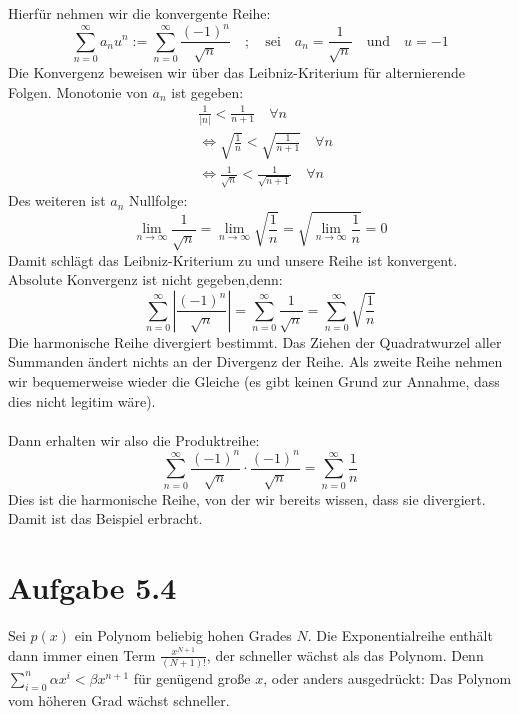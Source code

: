 \documentclass[a4paper,german,12pt,smallheadings]{scrartcl}
\begin{document}
Hierfür nehmen wir die konvergente Reihe:
\begin{equation*}
\sum\limits_{n=0}^{\infty} a_nu^n:=\sum\limits_{n=0}^{\infty} \frac{(-1)^n}{\sqrt{n}} \quad ; \quad \text{sei} \quad a_n=\frac{1}{\sqrt{n}} \quad \text{und} \quad u=-1
\end{equation*}
Die Konvergenz beweisen wir über das Leibniz-Kriterium für alternierende Folgen. Monotonie von $a_n$ ist gegeben:
\begin{align*}
  & \frac{1}{|n|}<\frac{1}{n+1} \quad \forall n\\
  & \Leftrightarrow \sqrt{\frac{1}{n}}<\sqrt{\frac{1}{n+1}} \quad \forall n\\
  & \Leftrightarrow \frac{1}{\sqrt{n}}< \frac{1}{\sqrt{n+1}} \quad \forall n
\end{align*}
Des weiteren ist $a_n$ Nullfolge:
\begin{equation}
\lim\limits_{n \to \infty} \frac{1}{\sqrt{n}}=\lim\limits_{n \to \infty} \sqrt{\frac{1}{n}}=\sqrt{\lim\limits_{n \to \infty} \frac{1}{n}}=0
\end{equation}
Damit schlägt das Leibniz-Kriterium zu und unsere Reihe ist konvergent.\\
Absolute Konvergenz ist nicht gegeben,denn:
\begin{equation*}
\sum\limits_{n=0}^{\infty} |\frac{(-1)^n}{\sqrt{n}}| = \sum\limits_{n=0}^{\infty} \frac{1}{\sqrt{n}}=\sum\limits_{n=0}^{\infty} \sqrt{\frac{1}{n}}
\end{equation*}
Die harmonische Reihe divergiert bestimmt. Das Ziehen der Quadratwurzel aller Summanden ändert nichts an der Divergenz der Reihe.
Als zweite Reihe nehmen wir bequemerweise wieder die Gleiche (es gibt keinen Grund zur Annahme, dass dies nicht legitim wäre).\\
\\
Dann erhalten wir also die Produktreihe:
\begin{equation*}
\sum\limits_{n=0}^{\infty} \frac{(-1)^n}{\sqrt{n}} \cdot \frac{(-1)^n}{\sqrt{n}}=\sum\limits_{n=0}^{\infty} \frac{1}{n}
\end{equation*}
Dies ist die harmonische Reihe, von der wir bereits wissen, dass sie divergiert. Damit ist das Beispiel erbracht.

\section*{Aufgabe 5.4}

Sei $p(x)$ ein Polynom beliebig hohen Grades $N$. Die Exponentialreihe enthält
dann immer einen Term $\frac{x^{N+1}}{(N+1)!}$, der schneller wächst als das
Polynom. Denn $\sum_{i=0}^n \alpha x^i < \beta x^{n+1}$ für genügend große $x$,
oder anders ausgedrückt: Das Polynom vom höheren Grad wächst schneller.
\end{document}

